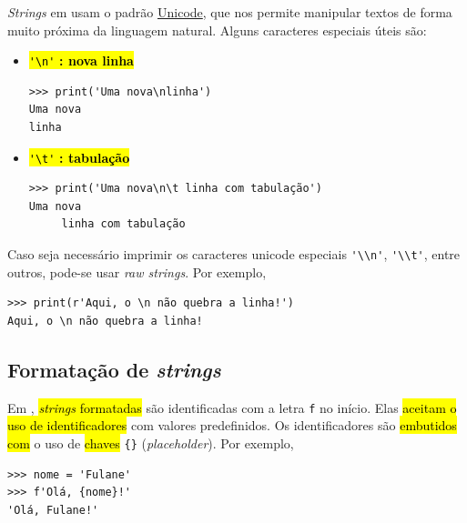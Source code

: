 \textit{Strings} em {\python} usam o padrão \href{https://home.unicode.org/}{Unicode}, que nos permite manipular textos de forma muito próxima da linguagem natural. Alguns caracteres especiais úteis são:
\begin{itemize}
\item \hl{{\lstinline+'\n'+} \textbf{: nova linha}}

\begin{lstlisting}
>>> print('Uma nova\nlinha')
Uma nova
linha
\end{lstlisting}

\item \hl{{\lstinline+'\t'+} \textbf{: tabulação}}

\begin{lstlisting}
>>> print('Uma nova\n\t linha com tabulação')
Uma nova
 	 linha com tabulação
\end{lstlisting}
\end{itemize}

\begin{obs}
  Caso seja necessário imprimir os caracteres unicode especiais \lstinline+'\\n'+, \lstinline+'\\t'+, entre outros, pode-se usar \textit{raw strings}. Por exemplo,
\begin{lstlisting}
>>> print(r'Aqui, o \n não quebra a linha!')
Aqui, o \n não quebra a linha!
\end{lstlisting}
\end{obs}

\subsection{Formatação de \textit{strings}}\label{cap_lingua_sec_string:subsec:format}

Em {\python}, \hl{\textit{strings} formatadas} são identificadas com a letra \lstinline+f+ no início. Elas \hl{aceitam o uso de identificadores} com valores predefinidos. Os identificadores são \hl{embutidos com} o uso de \hl{chaves} \lstinline+{}+ (\textit{placeholder}). Por exemplo,
\begin{lstlisting}
>>> nome = 'Fulane'
>>> f'Olá, {nome}!'
'Olá, Fulane!'
\end{lstlisting}

